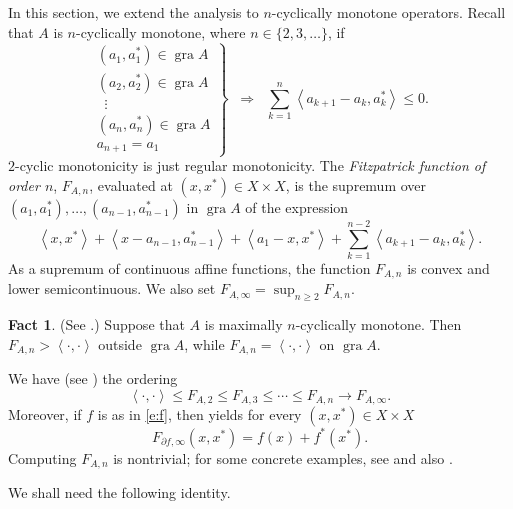 \documentclass[12pt]{article}
\newcommand{\scal}[2]{\left\langle{#1},{#2}  \right\rangle}
\theoremstyle{definition}
\newtheorem{fact}[theorem]{Fact}
\providecommand{\gr}{\operatorname{gra}}
\providecommand{\gr}{\operatorname{gra}}
\begin{document}
{In this section, we extend the analysis to $n$-cyclically monotone 
operators. 
Recall that $A$ is $n$-cyclically monotone, where $n\in\{2,3,\ldots\}$, if 
\begin{equation}
\left. 
\begin{array}{c}
(a_1,a_1^*)\in\gr A\\
(a_2,a_2^*)\in\gr A\\
\;\;\vdots\\
(a_n,a_n^*)\in\gr A\\
a_{n+1}=a_1
\end{array}
\right\}
\;\;\Rightarrow\;\;
\sum_{k=1}^{n} \scal{a_{k+1}-a_k}{a_k^*}\leq 0. 
\end{equation}
$2$-cyclic monotonicity is just regular monotonicity.
The \emph{Fitzpatrick function of order $n$}, $F_{A,n}$, 
evaluated at $(x,x^*)\in X\times X$, is the supremum over 
$(a_1,a_1^*),\ldots,(a_{n-1},a_{n-1}^*)$ in $\gr A$ of the expression
\begin{equation}
\label{e:FAn}
\scal{x}{x^*} + \scal{x-a_{n-1}}{a_{n-1}^*} + \scal{a_1-x}{x^*} + 
\sum_{k=1}^{n-2}\scal{a_{k+1}-a_k}{a_k^*}.
\end{equation}
As a supremum of continuous affine functions, 
the function $F_{A,n}$ is convex and lower semicontinuous. 
We also set $F_{A,\infty} = \sup_{n\geq 2} F_{A,n}$. 

\begin{fact} (See \cite[Corollary~2.8]{BBBRW}.)
Suppose that $A$ is maximally $n$-cyclically monotone. 
Then $F_{A,n}>\scal{\cdot}{\cdot}$ outside $\gr A$, while $F_{A,n}=\scal{\cdot}{\cdot}$ on $\gr A$. 
\end{fact}

We have (see \cite[Remark~2.10]{BBBRW}) the ordering 
\begin{equation}
\label{e:220510d}
\scal{\cdot}{\cdot} \leq F_{A,2}\leq F_{A,3}\leq \cdots \leq F_{A,n}\to F_{A,\infty}.
\end{equation}
Moreover, if $f$ is as in \cref{e:f}, then 
\cite[Theorem~3.5]{BBBRW} yields for every $(x,x^*)\in X\times X$ 
\begin{equation}
\label{e:220510e}
F_{\partial f,\infty}(x,x^*) = f(x)+f^*(x^*). 
\end{equation}
Computing $F_{A,n}$ is nontrivial; 
for some concrete examples, see 
\cite[Section~4]{BBBRW} and also \cite{BBW07}. 

We shall need the following identity.

}
\end{document}
